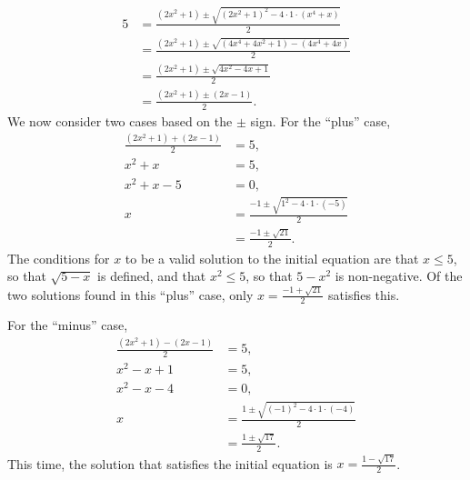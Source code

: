 \begin{enumerate}
\begin{align*}
5 &= \frac{(2x^2 + 1)\pm\sqrt{(2x^2 + 1)^2 - 4\cdot 1\cdot (x^4 + x)}}{2} \\
&= \frac{(2x^2 + 1)\pm\sqrt{(4x^4 + 4x^2 + 1) - (4x^4 + 4x)}}{2} \\
&= \frac{(2x^2 + 1)\pm\sqrt{4x^2 - 4x + 1}}{2} \\
&= \frac{(2x^2 + 1)\pm (2x - 1)}{2}.
\end{align*}
We now consider two cases based on the $\pm$ sign. For the ``plus'' case,
\begin{align*} 
\frac{(2x^2 + 1) + (2x - 1)}{2} &= 5, \\
x^2 + x &= 5, \\
x^2 + x - 5 &= 0, \\
x &= \frac{-1\pm\sqrt{1^2 - 4\cdot 1\cdot (-5)}}{2} \\
&= \frac{-1\pm\sqrt{21}}{2}.
\end{align*}
The conditions for $x$ to be a valid solution to the initial equation are that $x\leq 5$, so that $\sqrt{5 - x}$ is defined, and that $x^2\leq 5$, so that $5 - x^2$ is non-negative. Of the two solutions found in this ``plus'' case, only $\displaystyle x = \boxed{\frac{-1 + \sqrt{21}}{2}}$ satisfies this.\par 
For the ``minus'' case,
\begin{align*} 
\frac{(2x^2 + 1) - (2x - 1)}{2} &= 5, \\
x^2 - x + 1 &= 5, \\
x^2 - x - 4 &= 0, \\
x &= \frac{1\pm\sqrt{(-1)^2 - 4\cdot 1\cdot (-4)}}{2} \\
&= \frac{1\pm\sqrt{17}}{2}.
\end{align*}
This time, the solution that satisfies the initial equation is $\displaystyle x = \boxed{\frac{1 - \sqrt{17}}{2}}$.
\end{enumerate}